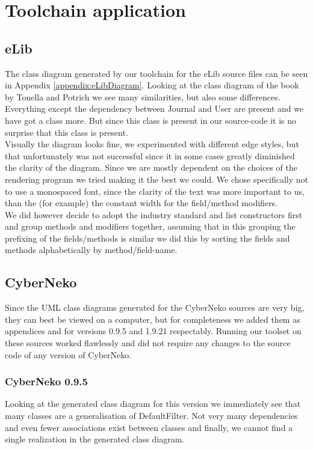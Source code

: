 \documentclass[a4paper,twoside,11pt]{article}
\begin{document}
\section{Toolchain application}
\label{sec:toolapplication}

\subsection{eLib}
\label{sec:elib}
The class diagram generated by our toolchain for the eLib source files can be seen in Appendix \ref{appendix:eLibDiagram}. Looking at the class diagram of the book by Tonella and Potrich\cite{book:book} we see many similarities, but also some differences. Everything except the dependency between Journal and User are present and we have got a class more. But since this class is present in our source-code it is no surprise that this class is present. \\

Visually the diagram looks fine, we experimented with different edge styles, but that unfortunately was not successful since it in some cases greatly diminished the clarity of the diagram. Since we are mostly dependent on the choices of the rendering program we tried making it the best we could. We chose specifically not to use a monospaced font, since the clarity of the text was more important to us, than the (for example) the constant width for the field/method modifiers. \\

We did however decide to adopt the industry standard and list constructors first and group methods and modifiers together, assuming that in this grouping the prefixing of the fields/methods is similar we did this by sorting the fields and methods alphabetically by method/field-name.

\subsection{CyberNeko}
\label{sec:cyberneko}
Since the UML class diagrams generated for the CyberNeko sources are very big, they can best be viewed on a computer, but for completeness we added them as appendices \cite{appendix:neko0} and \cite{appendix:neko1} for versions 0.9.5 and 1.9.21 respectably.  Running our toolset on these sources worked flawlessly and did not require any changes to the source code of any version of CyberNeko.

\subsubsection{CyberNeko 0.9.5}
\label{sec:cyberneko095}
Looking at the generated class diagram for this version we immediately see that many classes are a generalisation of {\sc DefaultFilter}. Not very many dependencies and even fewer associations exist between classes and finally, we cannot find a single realization in the generated class diagram. \\
\end{document}
